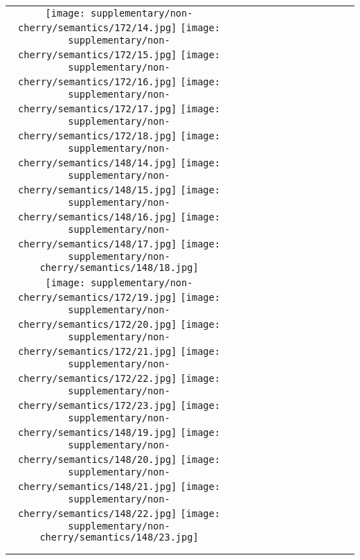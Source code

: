 \begin{figure*}[tb!]
{\begin{tabular}{c c c c c c c c c c c c }
\tabularnewline
  \texttt{[image: supplementary/non-cherry/semantics/172/14.jpg]}
  \texttt{[image: supplementary/non-cherry/semantics/172/15.jpg]}
  \texttt{[image: supplementary/non-cherry/semantics/172/16.jpg]}
  \texttt{[image: supplementary/non-cherry/semantics/172/17.jpg]}
  \texttt{[image: supplementary/non-cherry/semantics/172/18.jpg]}
    \hspace{5mm}
  \texttt{[image: supplementary/non-cherry/semantics/148/14.jpg]}
  \texttt{[image: supplementary/non-cherry/semantics/148/15.jpg]}
  \texttt{[image: supplementary/non-cherry/semantics/148/16.jpg]}
  \texttt{[image: supplementary/non-cherry/semantics/148/17.jpg]}
  \texttt{[image: supplementary/non-cherry/semantics/148/18.jpg]}

\tabularnewline
  \texttt{[image: supplementary/non-cherry/semantics/172/19.jpg]}
  \texttt{[image: supplementary/non-cherry/semantics/172/20.jpg]}
  \texttt{[image: supplementary/non-cherry/semantics/172/21.jpg]}
  \texttt{[image: supplementary/non-cherry/semantics/172/22.jpg]}
  \texttt{[image: supplementary/non-cherry/semantics/172/23.jpg]}
    \hspace{5mm}
  \texttt{[image: supplementary/non-cherry/semantics/148/19.jpg]}
  \texttt{[image: supplementary/non-cherry/semantics/148/20.jpg]}
  \texttt{[image: supplementary/non-cherry/semantics/148/21.jpg]}
  \texttt{[image: supplementary/non-cherry/semantics/148/22.jpg]}
  \texttt{[image: supplementary/non-cherry/semantics/148/23.jpg]}
    \tabularnewline

 \hspace{0.5mm}
  \tabularnewline
\vspace{2mm}
\vspace{-2\baselineskip}
\end{tabular}}
\vspace{-0.8cm}
\label{fig:sup1}
\vspace{-8mm}
\end{figure*}%